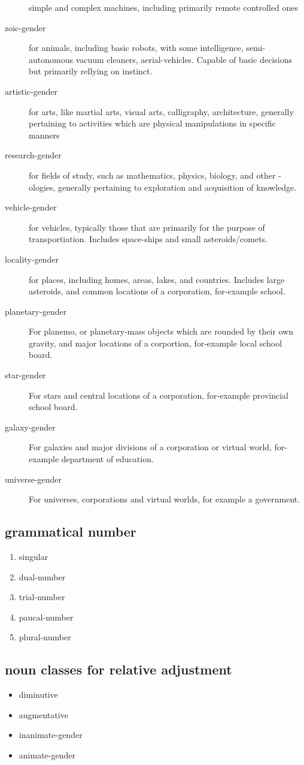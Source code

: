 \begin{multicols}{2}
\begin{description}
simple and complex machines, including primarily remote 
controlled ones 
\item[zoic-gender]
for animals, including basic robots, with some intelligence,
semi-autonomous vacuum cleaners, aerial-vehicles. Capable of
basic decisions but primarily rellying on instinct.
\item[artistic-gender]
for arts, like martial arts, visual arts, calligraphy,
architecture, generally pertaining to activities which are
physical manipulations in specific manners
\item[research-gender]
for fields of study, such as mathematics, physics, biology,
and other -ologies, generally pertaining to exploration and
acquisition of knowledge.
\item[vehicle-gender]
for vehicles, typically those that are primarily for the
purpose of transportiation. Includes space-ships and small
asteroids/comets. 
\item[locality-gender]
for places, including homes, areas, lakes, and
countries. Includes large asteroids, and common locations of a
corporation, for-example school.
\item[planetary-gender]
For planemo, or planetary-mass objects which are rounded by
their own gravity, and major locations of a corportion,
for-example local school board.
\item[star-gender]
For stars and central locations of a corporation,
for-example provincial school board.
\item[galaxy-gender]
For galaxies and major divisions of a corporation or virtual
world, for-example department of education.
\item[universe-gender]
For universes, corporations and virtual worlds, for example
a government.
\end{description}
\subsection{grammatical number}
\begin{enumerate}
\item singular
\item dual-number
\item trial-number
\item paucal-number
\item plural-number
\end{enumerate}
\subsection{noun classes for relative adjustment}
\begin{itemize}
\item diminutive
\item augmentative
\item inanimate-gender
\item animate-gender
\end{itemize}

\end{multicols}
